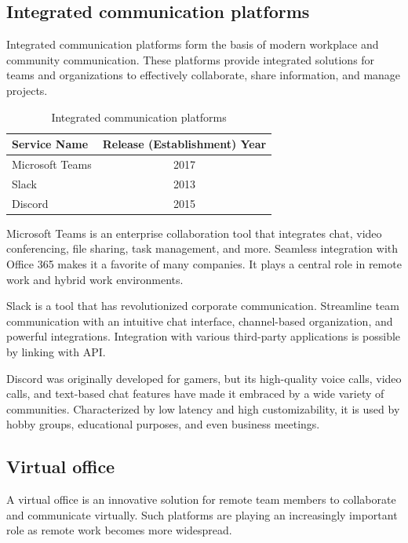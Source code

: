 \documentclass[12pt]{article}
\begin{document}
\subsection{Integrated communication platforms}
Integrated communication platforms form the basis of modern workplace and
community communication. These platforms provide integrated solutions for teams
and organizations to effectively collaborate, share information, and manage
projects.

\begin{table}[h]
    \begin{center}
        \begin{tabular}{|l|c|} \hline
            Service Name    & Release (Establishment) Year \\ \hline
            Microsoft Teams & 2017                         \\
            Slack           & 2013                         \\
            Discord         & 2015                         \\ \hline
        \end{tabular}
        \caption{Integrated communication platforms}
    \end{center}
\end{table}

Microsoft Teams is an enterprise collaboration tool that integrates chat, video
conferencing, file sharing, task management, and more. Seamless integration
with Office 365 makes it a favorite of many companies. It plays a central role
in remote work and hybrid work environments.

Slack is a tool that has revolutionized corporate communication. Streamline
team communication with an intuitive chat interface, channel-based
organization, and powerful integrations. Integration with various third-party
applications is possible by linking with API.

Discord was originally developed for gamers, but its high-quality voice calls,
video calls, and text-based chat features have made it embraced by a wide
variety of communities. Characterized by low latency and high customizability,
it is used by hobby groups, educational purposes, and even business meetings.

\subsection{Virtual office}
A virtual office is an innovative solution for remote team members to
collaborate and communicate virtually. Such platforms are playing an
increasingly important role as remote work becomes more widespread.
\end{document}
